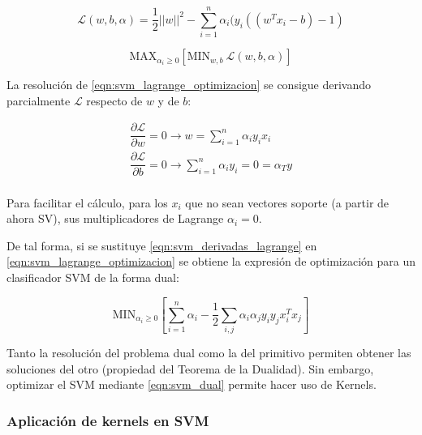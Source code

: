 \begin{equation}
	\mathcal{L}(w,b,\alpha) = \dfrac{1}{2}||w||^{2}	- \sum_{i=1}^{n}\alpha_{i}(y_{i}((w^{T}x_{i}-b)-1)
	\label{eqn:svm_lagrange_multiplicadores}
\end{equation}

\begin{equation}
	\mbox{MAX}_{\alpha_{i}\geq0}\left[\mbox{MIN}_{w,b}\:\mathcal{L}(w,b,\alpha)\right]
	\label{eqn:svm_lagrange_optimizacion}
\end{equation}

La resolución de \ref{eqn:svm_lagrange_optimizacion} se consigue derivando parcialmente $\mathcal{L}$ respecto de $w$ y de $b$:

\begin{equation}
	\begin{split}
		\dfrac{\partial \mathcal{L}}{\partial w} = 0 \rightarrow w = \sum_{i=1}^{n} \alpha_{i}y_{i}x_{i} \\
		\dfrac{\partial \mathcal{L}}{\partial b} = 0 \rightarrow \sum_{i=1}^{n} \alpha_{i}y_{i} = 0 = \alpha_{T}y \\
	\end{split}
	\label{eqn:svm_derivadas_lagrange}
\end{equation}

Para facilitar el cálculo, para los $x_{i}$ que no sean vectores soporte (a partir de ahora SV), sus multiplicadores de Lagrange $\alpha_{i} = 0$.

De tal forma, si se sustituye \ref{eqn:svm_derivadas_lagrange} en \ref{eqn:svm_lagrange_optimizacion} se obtiene la expresión de optimización para un clasificador SVM de la forma dual:

\begin{equation}
	\mbox{MIN}_{\alpha_{i}\geq0} \left[\sum_{i=1}^{n}\alpha_{i} - \dfrac{1}{2}\sum_{i,j}\alpha_{i}\alpha_{j}y_{i}y_{j}x_{i}^{T}x_{j}\right]
	\label{eqn:svm_dual}
\end{equation}


Tanto la resolución del problema dual como la del primitivo permiten obtener las soluciones del otro (propiedad del Teorema de la Dualidad). Sin embargo, optimizar el SVM mediante \ref{eqn:svm_dual} permite hacer uso de Kernels.

\subsubsection{Aplicación de kernels en SVM}

